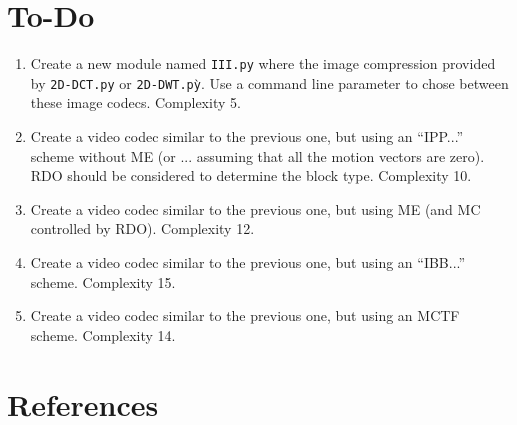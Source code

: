 \section{To-Do}

\begin{enumerate}
\item Create a new module named \texttt{III.py} where the image
  compression provided by \texttt{2D-DCT.py} or
  \texttt{2D-DWT.pỳ}. Use a command line parameter to chose between
  these image codecs. Complexity 5.
\item Create a video codec similar to the previous one, but using an
  ``IPP...''  scheme without ME (or ... assuming that all the motion
  vectors are zero). RDO should be considered to determine the block
  type. Complexity 10.
\item Create a video codec similar to the previous one, but using ME
  (and MC controlled by RDO). Complexity 12.
\item Create a video codec similar to the previous one, but using an
  ``IBB...'' scheme. Complexity 15.
\item Create a video codec similar to the previous one, but using an
  MCTF scheme. Complexity 14.
\end{enumerate}

  
\section{References}

\renewcommand{\addcontentsline}[3]{}%


